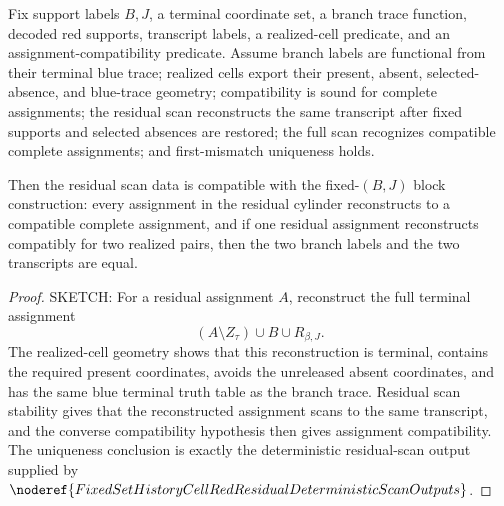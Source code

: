 \begin{helper}
Fix support labels \(B,J\), a terminal coordinate set, a branch trace
function, decoded red supports, transcript labels, a realized-cell predicate,
and an assignment-compatibility predicate.  Assume branch labels are
functional from their terminal blue trace; realized cells export their
present, absent, selected-absence, and blue-trace geometry; compatibility is
sound for complete assignments; the residual scan reconstructs the same
transcript after fixed supports and selected absences are restored; the full
scan recognizes compatible complete assignments; and first-mismatch
uniqueness holds.

Then the residual scan data is compatible with the fixed-\((B,J)\) block
construction: every assignment in the residual cylinder reconstructs to a
compatible complete assignment, and if one residual assignment reconstructs
compatibly for two realized pairs, then the two branch labels and the two
transcripts are equal.
\end{helper}
\begin{proof}
SKETCH:
For a residual assignment \(A\), reconstruct the full terminal assignment
\[
(A\setminus Z_\tau)\cup B\cup R_{\beta,J}.
\]
The realized-cell geometry shows that this reconstruction is terminal,
contains the required present coordinates, avoids the unreleased absent
coordinates, and has the same blue terminal truth table as the branch trace.
Residual scan stability gives that the reconstructed assignment scans to the
same transcript, and the converse compatibility hypothesis then gives
assignment compatibility.  The uniqueness conclusion is exactly the
deterministic residual-scan output supplied by
\(\noderef{FixedSetHistoryCellRedResidualDeterministicScanOutputs}\).
\end{proof}
